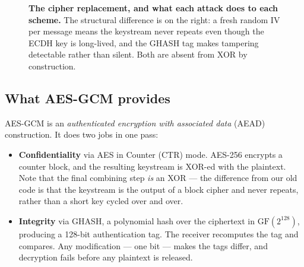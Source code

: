 \begin{figure}[H]
{}
\caption[XOR versus AES-GCM]{\textbf{The cipher replacement, and what each attack does to
each scheme.} The structural difference is on the right: a fresh random IV per message means
the keystream never repeats even though the ECDH key is long-lived, and the GHASH tag makes
tampering detectable rather than silent. Both are absent from XOR by construction.}
\label{fig:xor-vs-aes}
\end{figure}

\subsection{What AES-GCM provides}

AES-GCM \cite{gcm} is an \emph{authenticated encryption with associated data} (AEAD)
construction. It does two jobs in one pass:

\begin{itemize}
\item \textbf{Confidentiality} via AES in Counter (CTR) mode. AES-256 encrypts a counter
      block, and the resulting keystream is XOR-ed with the plaintext. Note that the final
      combining step \emph{is} an XOR --- the difference from our old code is that the
      keystream is the output of a block cipher and never repeats, rather than a short key
      cycled over and over.
\item \textbf{Integrity} via GHASH, a polynomial hash over the ciphertext in
      $\mathrm{GF}(2^{128})$, producing a 128-bit authentication tag. The receiver
      recomputes the tag and compares. Any modification --- one bit --- makes the tags
      differ, and decryption fails before any plaintext is released.
\end{itemize}

